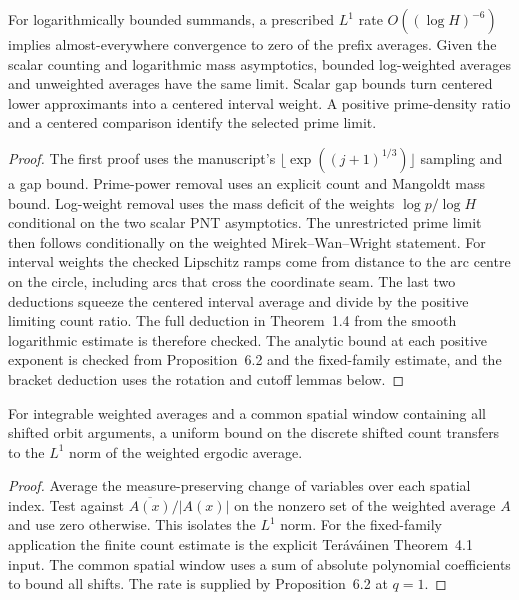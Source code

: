 \begin{lemma}\label{checked-ergodic}
\leanok
For logarithmically bounded summands, a prescribed $L^1$ rate
$O((\log H)^{-6})$ implies almost-everywhere convergence to zero
of the prefix averages. Given the scalar counting and logarithmic
mass asymptotics, bounded log-weighted averages and unweighted
averages have the same limit. Scalar gap bounds turn centered lower
approximants into a centered interval weight. A positive prime-density
ratio and a centered comparison identify the selected prime limit.
\end{lemma}
\begin{proof}
\leanok
The first proof uses the manuscript's
$\lfloor\exp((j+1)^{1/3})\rfloor$ sampling and a gap bound.
Prime-power removal uses an explicit count and Mangoldt mass bound.
Log-weight removal uses the mass deficit of the weights $\log p/\log H$
conditional on the two scalar PNT asymptotics. The unrestricted
prime limit then follows conditionally on the weighted
Mirek--Wan--Wright statement. For interval weights the checked
Lipschitz ramps come from distance to the arc centre on the circle,
including arcs that cross the coordinate seam.
The last two deductions squeeze the centered interval average and
divide by the positive limiting count ratio. The full deduction
in Theorem~1.4 from the smooth logarithmic estimate is therefore
checked. The analytic bound at each positive exponent is checked from
Proposition~6.2 and the fixed-family estimate, and the bracket
deduction uses the rotation and cutoff lemmas below.
\end{proof}

\begin{lemma}\label{checked-orbit}
\leanok
For integrable weighted averages and a common spatial window
containing all shifted orbit arguments, a uniform bound on
the discrete shifted count transfers to the $L^1$ norm of
the weighted ergodic average.
\end{lemma}
\begin{proof}
\leanok
Average the measure-preserving change of variables over each
spatial index. Test against $\overline{A(x)}/|A(x)|$ on the
nonzero set of the weighted average $A$ and use zero otherwise.
This isolates the $L^1$ norm. For the fixed-family application the finite count estimate is the
explicit Ter\'av\'ainen Theorem~4.1 input. The common spatial window
uses a sum of absolute polynomial coefficients to bound all shifts.
The rate is supplied by Proposition~6.2 at $q=1$.
\end{proof}

